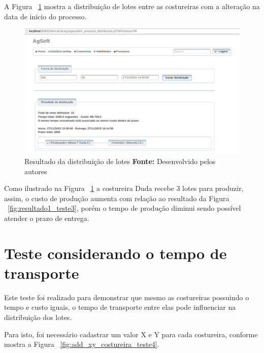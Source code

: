 A Figura ~\ref{fig:resultado2_teste3} mostra a distribuição de lotes entre as
costureiras com a alteração na data de inicio do processo.

\begin{figure}[h!]
	\centerline{\includegraphics[scale=0.4]{./imagens/resultado2_teste3.png}}
	\caption[Resultado da distribuição de lotes]
	{Resultado da distribuição de lotes \textbf{Fonte:} Desenvolvido pelos autores}
	\label{fig:resultado2_teste3}
\end{figure}

\par Como ilustrado na Figura ~\ref{fig:resultado2_teste3} a costureira Duda
recebe 3 lotes para produzir, assim, o custo de produção aumenta com relação ao 
resultado da Figura ~\ref{fig:resultado1_teste3}, porém o tempo de produção diminui
sendo possível atender o prazo de entrega.


\section{Teste considerando o tempo de transporte}

\par Este teste foi realizado para demonstrar que mesmo as costureiras possuindo
o tempo e custo iguais, o tempo de transporte entre elas pode influenciar na distribuição dos lotes.

\par Para isto, foi necessário cadastrar um valor X e Y para cada costureira, 
conforme mostra a Figura ~\ref{fig:add_xy_costureira_teste4}.

\newpage



